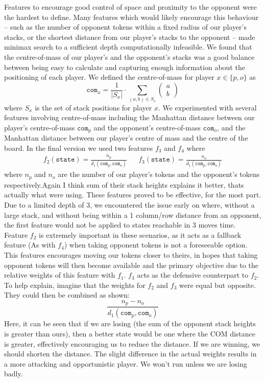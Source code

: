\documentclass[11pt]{article}
\newcommand{\drafting}[1]{\textcolor{OliveGreen}{#1}}
\begin{document}
Features to encourage good control of space and proximity to the opponent were the hardest to define. Many features which would likely encourage this behaviour -- such as the number of opponent tokens within a fixed radius of our player's stacks, or the shortest distance from our player's stacks to the opponent -- made minimax search to a sufficient depth computationally infeasible. We found that the centre-of-mass of our player's and the opponent's stacks was a good balance between being easy to calculate and capturing enough information about the positioning of each player. We defined the centre-of-mass for player $x \in \{p, o\}$ as 
\[
    \texttt{com}_x = \frac{1}{|S_x|} \cdot \sum _{(a, b) \in S_x} \begin{pmatrix}
        a \\ b
    \end{pmatrix}
\]
where $S_x$ is the set of stack positions for player $x$. We experimented with several features involving centre-of-mass including the Manhattan distance between our player's centre-of-mass $\texttt{com}_p$ and the opponent's centre-of-mass $\texttt{com}_o$, and the Manhattan distance between our player's centre of mass and the centre of the board. In the final version we used two features $f_3$ and $f_4$ where
\begin{align*}
    f_2(\texttt{state}) = \frac{n_p}{d_1(\texttt{com}_p, \texttt{com}_o)} && f_3(\texttt{state}) = \frac{n_o}{d_1(\texttt{com}_p, \texttt{com}_o)}
\end{align*}
where $n_p$ and $n_o$ are the number of our player's tokens and the opponent's tokens respectively.\drafting{Again I think sum of their stack heights explains it better, thats actually what were using.} \drafting{These features proved to be effective, for the most part. Due to a limited depth of 3, we encountered the issue early on where, without a large stack, and without being within a 1 column/row distance from an opponent, the first feature would not be applied to states reachable in 3 moves time. Feature $f_2$ is extremely important in these scenarios, as it acts as a fallback feature (As with $f_4$) when taking opponent tokens is not a foreseeable option. This features encourages moving our tokens closer to theirs, in hopes that taking opponent tokens will then become available and the primary objective due to the relative weights of this feature with $f_1$. $f_3$ acts as the defensive counterpart to $f_2$. To help explain, imagine that the weights for $f_2$ and $f_3$ were equal but opposite. They could then be combined as shown:
\[
    \frac{n_p - n_o}{d_1(\texttt{com}_p, \texttt{com}_o)}
\]
Here, it can be seen that if we are losing (the sum of the opponent stack heights is greater than ours), then a better state would be one where the COM distance is greater, effectively encouraging us to reduce the distance. If we are winning, we should shorten the distance. The slight difference in the actual weights results in a more attacking and opportunistic player. We won't run unless we are losing badly.
}
\end{document}
